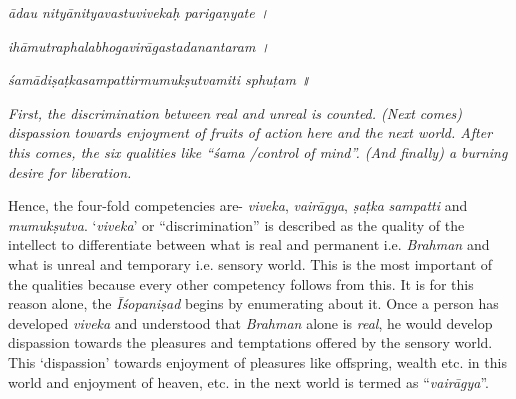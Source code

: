\emph{ādau nityānityavastuvivekaḥ parigaṇyate ।}

\emph{ihāmutraphalabhogavirāgastadanantaram ।}

\emph{śamādiṣaṭkasampattirmumukṣutvamiti sphuṭam ॥}

\emph{First, the discrimination between real and unreal is counted. (Next comes) dispassion towards enjoyment of fruits of action here and the next world. After this comes, the six qualities like ``śama /control of mind''. (And finally) a burning desire for liberation.}

Hence, the four-fold competencies are- \emph{viveka}, \emph{vairāgya}, \emph{ṣaṭka} \emph{sampatti} and \emph{mumukṣutva}. `\emph{viveka}' or ``discrimination'' is described as the quality of the intellect to differentiate between what is real and permanent i.e. \emph{Brahman} and what is unreal and temporary i.e. sensory world. This is the most important of the qualities because every other competency follows from this. It is for this reason alone, the \emph{Īśopaniṣad} begins by enumerating about it. Once a person has developed \emph{viveka} and understood that \emph{Brahman} alone is \emph{real}, he would develop dispassion towards the pleasures and temptations offered by the sensory world. This `dispassion' towards enjoyment of pleasures like offspring, wealth etc. in this world and enjoyment of heaven, etc. in the next world is termed as ``\emph{vairāgya}''.

